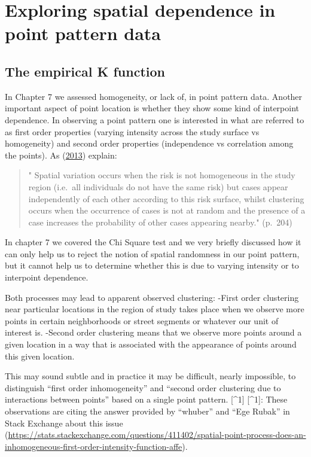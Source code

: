 \documentclass[
  krantz2]{krantz}
\begin{document}
\hypertarget{exploring-spatial-dependence-in-point-pattern-data}{%
\section{Exploring spatial dependence in point pattern data}\label{exploring-spatial-dependence-in-point-pattern-data}}

\hypertarget{the-empirical-k-function}{%
\subsection{The empirical K function}\label{the-empirical-k-function}}

In Chapter 7 we assessed homogeneity, or lack of, in point pattern data. Another important aspect of point location is whether they show some kind of interpoint dependence. In observing a point pattern one is interested in what are referred to as first order properties (varying intensity across the study surface vs homogeneity) and second order properties (independence vs correlation among the points). As (\protect\hyperlink{ref-Bivand_2013}{2013}) explain:

\begin{quote}
" Spatial variation occurs when the risk is not homogeneous in the study region (i.e.~all individuals do not have the same risk) but cases appear independently of each other according to this risk surface, whilst clustering occurs when the occurrence of cases is not at random and the presence of a case increases the probability of other cases appearing nearby." (p.~204)
\end{quote}

In chapter 7 we covered the Chi Square test and we very briefly discussed how it can only help us to reject the notion of spatial randomness in our point pattern, but it cannot help us to determine whether this is due to varying intensity or to interpoint dependence.

Both processes may lead to apparent observed clustering:
-First order clustering near particular locations in the region of study takes place when we observe more points in certain neighborhoods or street segments or whatever our unit of interest is.
-Second order clustering means that we observe more points around a given location in a way that is associated with the appearance of points around this given location.

This may sound subtle and in practice it may be difficult, nearly impossible, to distinguish ``first order inhomogeneity'' and ``second order clustering due to interactions between points'' based on a single point pattern. {[}\^{}1{]}
{[}\^{}1{]}: These observations are citing the answer provided by ``whuber'' and ``Ege Rubak'' in Stack Exchange about this issue (\url{https://stats.stackexchange.com/questions/411402/spatial-point-process-does-an-inhomogeneous-first-order-intensity-function-affe}).
\end{document}
